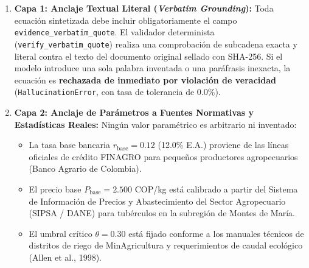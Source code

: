 \documentclass[11pt,a4paper]{article}
\begin{document}
\begin{enumerate}[leftmargin=*]
    \item \textbf{Capa 1: Anclaje Textual Literal (\textit{Verbatim Grounding}):}
    Toda ecuaci\'on sintetizada debe incluir obligatoriamente el campo \texttt{evidence\_verbatim\_quote}. El validador determinista (\texttt{verify\_verbatim\_quote}) realiza una comprobaci\'on de subcadena exacta y literal contra el texto del documento original sellado con SHA-256. Si el modelo introduce una sola palabra inventada o una par\'afrasis inexacta, la ecuaci\'on es \textbf{rechazada de inmediato por violaci\'on de veracidad} (\texttt{HallucinationError}, con tasa de tolerancia de 0.0\%).

    \item \textbf{Capa 2: Anclaje de Par\'ametros a Fuentes Normativas y Estad\'isticas Reales:}
    Ning\'un valor param\'etrico es arbitrario ni inventado:
    \begin{itemize}
        \item La tasa base bancaria $r_{\text{base}} = 0.12$ (12.0\% E.A.) proviene de las l\'ineas oficiales de cr\'edito FINAGRO para peque\~nos productores agropecuarios (Banco Agrario de Colombia).
        \item El precio base $P_{\text{base}} = 2.500$ COP/kg est\'a calibrado a partir del Sistema de Informaci\'on de Precios y Abastecimiento del Sector Agropecuario (SIPSA / DANE) para tub\'erculos en la subregi\'on de Montes de Mar\'ia.
        \item El umbral cr\'itico $\theta = 0.30$ est\'a fijado conforme a los manuales t\'ecnicos de distritos de riego de MinAgricultura y requerimientos de caudal ecol\'ogico (Allen et al., 1998).
    \end{itemize}


\end{enumerate}
\end{document}
